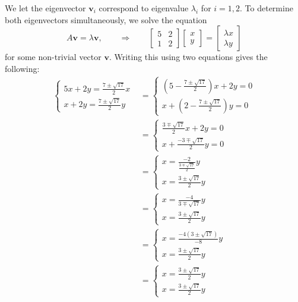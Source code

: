 \documentclass[]{exam}
\numberwithin{equation}{section}
\begin{document}
\begin{questions}
\begin{parts}
We let the eigenvector $\boldsymbol{v}_i$ correspond to eigenvalue $\lambda_i$ for $i = 1, 2$.  To determine both eigenvectors simultaneously, we solve the equation 
\[ A \boldsymbol{v} = \lambda \boldsymbol{v}, \qquad \Rightarrow \qquad \begin{bmatrix} 5 & 2 \\ 1 & 2 \end{bmatrix} \begin{bmatrix} x \\ y \end{bmatrix} = \begin{bmatrix} \lambda x \\ \lambda y \end{bmatrix} \]
for some non-trivial vector $\boldsymbol{v}$.  Writing this using two equations gives the following: 
\begin{align*}
	\begin{cases}
		5x + 2y = \frac{7 \pm  \sqrt{17}}{2}x \\ 
		x + 2y = \frac{7 \pm  \sqrt{17}}{2}y \end{cases} & = 
	\begin{cases} 
		\left( 5 - \frac{7 \pm  \sqrt{17}}{2}\right)x + 2y = 0 \\ 
		x + \left( 2 -  \frac{7 \pm  \sqrt{17}}{2}\right)y = 0 \end{cases} \\ 
		& =
	\begin{cases} 
		\frac{3 \mp \sqrt{17}}{2} x + 2y = 0 \\ 
		x + \frac{-3 \mp \sqrt{17}}{2}y = 0 \end{cases} \\
		& =
	\begin{cases} 
		x = \frac{-2}{\frac{3 \mp \sqrt{17}}{2} }y \\ 
		x =\frac{3 \pm \sqrt{17}}{2}y  \end{cases} \\ 
		& = 
	\begin{cases} 
		x = \frac{-4}{3 \mp \sqrt{17} }y \\ 
		x =\frac{3 \pm \sqrt{17}}{2}y  \end{cases} \\ 
		& = 
		\begin{cases} 
		x = \frac{-4(3 \pm \sqrt{17})}{-8 }y \\ 
		x =\frac{3 \pm \sqrt{17}}{2}y  \end{cases} \\ 
		&=
	\begin{cases} 
		x = \frac{3 \pm \sqrt{17}}{2}y \\ 
		x =\frac{3 \pm \sqrt{17}}{2}y  \end{cases}\end{align*}


\end{parts}
\end{questions}
\end{document}
